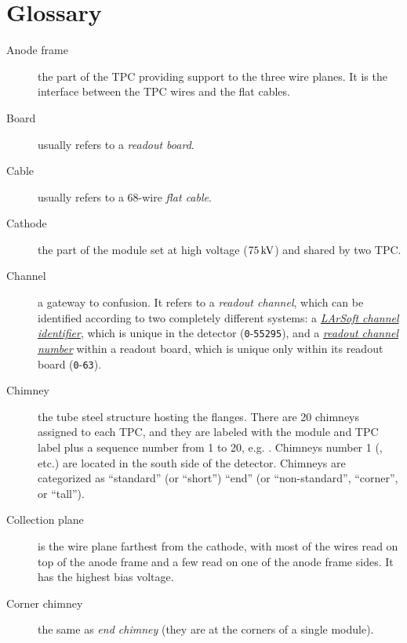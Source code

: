 \section{Glossary}
\label{sec:glossary}

\begin{description}

  \item[Anode frame]
    the part of the TPC providing support to the three wire
    planes. It is the interface between the TPC wires and the flat cables.

  \item[Board]
    usually refers to a \emph{readout board}.

  \item[Cable]
    usually refers to a 68-wire \emph{flat cable}.

  \item[Cathode]
    the part of the module set at high voltage ($75\,\textnormal{kV}$)
    and shared by two TPC.

  \item[Channel]
    a gateway to confusion. It refers to a \emph{readout channel},
    which can be identified according to two completely different systems:
    a \hyperlink{glossary:LArSoftChannelID}{\emph{LArSoft channel identifier}},
    which is unique in the detector (\texttt{0}-\texttt{55295}),
    and a \hyperlink{glossary:ReadoutChannelNumber}{\emph{readout channel number}}
    within a readout board,
    which is unique only within its readout board (\texttt{0}-\texttt{63}).
  
  \item[Chimney]
    the tube steel structure hosting the flanges. There are 20 chimneys assigned
    to each TPC, and they are labeled with the module and TPC label plus a
    sequence number from 1 to 20, e.g. . Chimneys number 1
    (,  etc.) are located in the south side of the
    detector. Chimneys are categorized as ``standard'' (or ``short'')
    ``end'' (or ``non-standard'', ``corner'', or ``tall'').

  \item[Collection plane]
    is the wire plane farthest from the cathode,
    with most of the wires read on top of the anode frame and a few read on one
    of the anode frame sides. It has the highest bias voltage.

  \item[Corner chimney]
    the same as \emph{end chimney} (they are at the corners of a single module).


\end{description}
